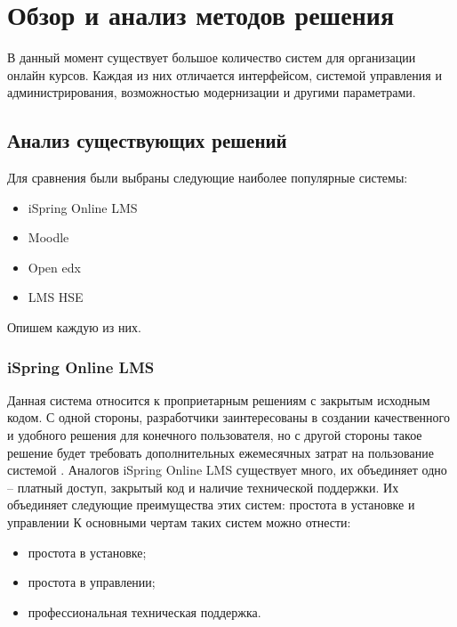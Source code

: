 \documentclass[a4paper,14pt]{article}
\begin{document}




\section{Обзор и анализ методов решения}

В данный момент существует большое количество систем для организации онлайн курсов.
Каждая из них отличается интерфейсом, системой управления и администрирования, возможностью модернизации и другими параметрами.

\subsection{Анализ существующих решений}

Для сравнения были выбраны следующие наиболее популярные системы:

\begin{itemize}
	\item iSpring Online LMS
	\item Moodle	
	\item Open edx
	\item LMS HSE
\end{itemize}

Опишем каждую из них.

\subsubsection{iSpring Online LMS}

Данная система относится к проприетарным решениям с закрытым исходным кодом.
С одной стороны, разработчики заинтересованы в создании качественного и удобного решения для конечного пользователя, но с другой стороны такое решение будет требовать дополнительных ежемесячных затрат на пользование системой \cite{iSpring}.
Аналогов iSpring Online LMS существует много, их объединяет одно -- платный доступ, закрытый код и наличие технической поддержки.
Их объединяет следующие преимущества этих систем: простота в установке и управлении
К основными чертам таких систем можно отнести:
\begin{itemize}
	\item простота в установке;
	\item простота в управлении;	
	\item профессиональная техническая поддержка.
\end{itemize}
\end{document}

